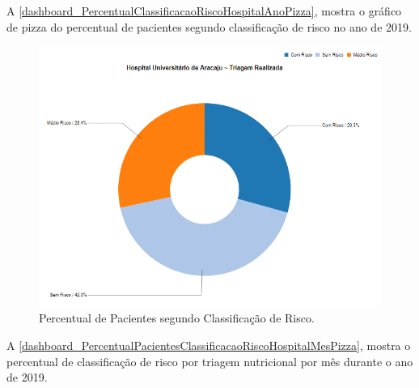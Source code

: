 \newpage
A \autoref{dashboard_PercentualClassificacaoRiscoHospitalAnoPizza}, mostra o gráfico de pizza do percentual de pacientes segundo classificação de risco no ano de 2019.

\begin{figure}[htb]
	\caption{\label{dashboard_PercentualClassificacaoRiscoHospitalAnoPizza}Percentual de Pacientes segundo Classificação de Risco.}
	\begin{center}
	    \includegraphics[scale=0.9]{Imagens/2.1.PercentualPacientesClassificacaoRiscoHospitalAnoPizza.png}
	\end{center}
\end{figure}

\clearpage
A \autoref{dashboard_PercentualPacientesClassificacaoRiscoHospitalMesPizza}, mostra o percentual de classificação de risco por triagem nutricional por mês durante o ano de 2019.

